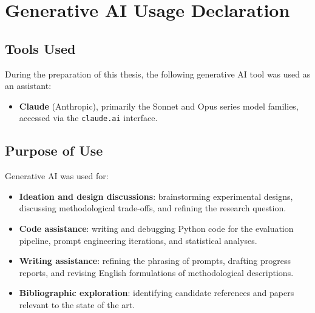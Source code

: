
\chapter{Generative AI Usage Declaration}
\label{app:ai-declaration}



\section*{Tools Used}

During the preparation of this thesis, the following generative AI tool was
used as an assistant:

\begin{itemize}
    \item \textbf{Claude} (Anthropic), primarily the Sonnet and Opus series
        model families, accessed via the \texttt{claude.ai} interface.
\end{itemize}

\section*{Purpose of Use}

Generative AI was used for:

\begin{itemize}
    \item \textbf{Ideation and design discussions}: brainstorming experimental
        designs, discussing methodological trade-offs, and refining the
        research question.
    \item \textbf{Code assistance}: writing and debugging Python code for the
        evaluation pipeline, prompt engineering iterations, and statistical
        analyses.
    \item \textbf{Writing assistance}: refining the phrasing of prompts,
        drafting progress reports, and revising English formulations of
        methodological descriptions.
    \item \textbf{Bibliographic exploration}: identifying candidate references
        and papers relevant to the state of the art.
\end{itemize}

